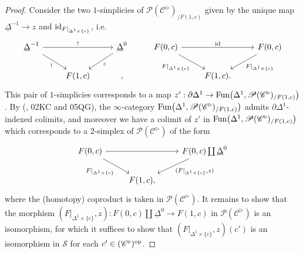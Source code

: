 \documentclass{tac}
\newcommand{\s}[1]{\mathscr{#1}}
\newcommand{\tx}[1]{\textnormal{#1}}
\newcommand{\ul}[1]{\underline{#1}}
\begin{document}
\begin{proof}
Consider the two $1$-simplicies of $\s{P}(\s{C}^\triangleright )_{/ F(1,c)}$ given by the unique map $\ul{\Delta}^{-1} \to z$ and $\tx{id}_{F|_{\Delta^1 \times \{c\}}}$, i.e.
\[ \begin{tikzcd}
\ul{\Delta}^{-1} \arrow[]{rr}{!} \arrow[]{dr}[swap]{!} & & \ul{\Delta}^0 \arrow[]{dl}{z} & F(0,c) \arrow[]{rr}{\tx{id}} \arrow[]{dr}[swap]{F|_{\Delta^1 \times \{c\}}} & &  F(0,c) \arrow[]{dl}{F|_{\Delta^1 \times \{c\}}} \\
 & F(1,c) & , & & F(1,c). &
\end{tikzcd}\]
This pair of $1$-simplicies corresponds to a map $z' : \partial \Delta^1 \to \tx{Fun}\big( \Delta^1 , \s{P}(\s{C}^\triangleright )_{/F(1,c)} \big)$.  By (\cite{kerodon}, 02KC and 05QG), the $\infty$-category $\tx{Fun}\big( \Delta^1 , \s{P}(\s{C}^\triangleright )_{/F(1,c)} \big)$ admits $\partial \Delta^1$-indexed colimits, and moreover we have a colimit of $z'$ in $\tx{Fun}\big( \Delta^1 , \s{P}(\s{C}^\triangleright )_{/F(1,c)} \big)$ which corresponds to a $2$-simplex of $\s{P}(\s{C}^\triangleright )$ of the form 
\[\begin{tikzcd}
F(0,c) \arrow[]{rr}  \arrow[]{dr}[swap]{F|_{\Delta^1 \times \{c\}}}  & & F(0,c) \coprod \ul{\Delta}^0 \arrow[]{dl}{(F|_{\Delta^1 \times \{c\} }, z)} \\
 & F(1,c), & 
\end{tikzcd}\]
where the (homotopy) coproduct is taken in $\s{P}(\s{C}^\triangleright )$.  It remains to show that the morphism $(F|_{\Delta^1 \times \{c\} }, z) : F(0,c) \coprod \ul{\Delta}^0 \to F(1,c)$ in $\s{P}(\s{C}^\triangleright )$ is an isomorphism, for which it suffices to show that $(F|_{\Delta^1 \times \{c\} }, z)(c')$ is an isomorphism in $\s{S}$ for each $c' \in (\s{C}^\triangleright )^\tx{op}$.  


\end{proof}
\end{document}
